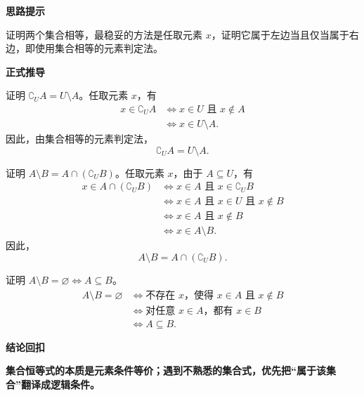 \begin{proofbox}
	\textbf{\textcolor{CProof}{思路提示}}

	证明两个集合相等，最稳妥的方法是任取元素 \(x\)，证明它属于左边当且仅当属于右边，即使用集合相等的元素判定法。

	\medskip
	\textbf{\textcolor{CProof}{正式推导}}
	\begin{description}[style=nextline, leftmargin=2.8em, labelsep=0.5em, itemsep=0.55em]
		\item[\textbf{步骤一（补集写成差集）：}]
		      证明 \(\complement_U A=U\setminus A\)。任取元素 \(x\)，有
		      \[
			      \begin{aligned}
				      x\in\complement_U A
				       & \iff x\in U\text{ 且 }x\notin A \\
				       & \iff x\in U\setminus A.
			      \end{aligned}
		      \]
		      因此，由集合相等的元素判定法，
		      \[
			      \complement_U A=U\setminus A.
		      \]

		\item[\textbf{步骤二（差集写成交集与补集）：}]
		      证明 \(A\setminus B=A\cap(\complement_U B)\)。任取元素 \(x\)，由于 \(A\subseteq U\)，有
		      \[
			      \begin{aligned}
				      x\in A\cap(\complement_U B)
				       & \iff x\in A\text{ 且 }x\in\complement_U B       \\
				       & \iff x\in A\text{ 且 }x\in U\text{ 且 }x\notin B \\
				       & \iff x\in A\text{ 且 }x\notin B                 \\
				       & \iff x\in A\setminus B.
			      \end{aligned}
		      \]
		      因此，
		      \[
			      A\setminus B=A\cap(\complement_U B).
		      \]

		\item[\textbf{步骤三（差集为空与子集）：}]
		      证明 \(A\setminus B=\varnothing\iff A\subseteq B\)。
		      \[
			      \begin{aligned}
				      A\setminus B=\varnothing
				       & \iff \text{不存在 }x\text{，使得 }x\in A\text{ 且 }x\notin B \\
				       & \iff \text{对任意 }x\in A\text{，都有 }x\in B               \\
				       & \iff A\subseteq B.
			      \end{aligned}
		      \]
	\end{description}

	\medskip
	\textbf{\textcolor{CProof}{结论回扣}}

	\textbf{集合恒等式的本质是元素条件等价；遇到不熟悉的集合式，优先把“属于该集合”翻译成逻辑条件。}
\end{proofbox}